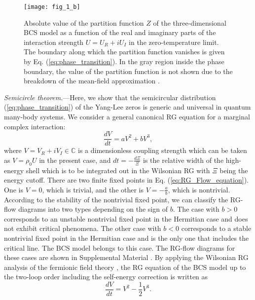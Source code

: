 \documentclass[aps,prl,twocolumn,superscriptaddress]{revtex4-1}
\begin{document}
\begin{bibunit}[apsrev4-2]
\begin{figure}
\texttt{[image: fig\_1\_b]}

\caption{Absolute value of the partition function $Z$ of the three-dimensional
BCS model as a function of the real and imaginary parts of the interaction
strength $U=U_{R}+iU_{I}$ in the zero-temperature limit. The boundary
along which the partition function vanishes is given by Eq. (\ref{eq:phase_transition}). In the gray region inside
the phase boundary, the value of the partition function is not shown
due to the breakdown of the mean-field approximation \cite{Yamamoto2019}.}

\label{Phase_transition_line}
\end{figure}

\emph{Semicircle theorem}.---Here, we show that the semicircular
distribution (\ref{eq:phase_transition}) of the Yang-Lee zeros is generic and universal in quantum many-body systems.
We consider a general canonical RG equation for a marginal
complex interaction: 
\begin{equation}
\frac{dV}{dt}=aV^{2}+bV^{3},\label{eq:RG_Flow_equation}
\end{equation}
where $V=V_{R}+iV_{I}\in\mathbb{C}$ is a dimensionless coupling strength
which can be taken as $V=\rho_{0}U$ in the present case, and $dt=-\frac{d\Xi}{\Xi}$
is the relative width of the high-energy shell which is to be integrated out in the Wilsonian RG with $\Xi$ being the energy cutoff. There are two finite fixed points in Eq. (\ref{eq:RG_Flow_equation}). One is $V=0$, which is trivial, and the other is $V=-\frac{a}{b}$, which is nontrivial. According to the stability of the nontrivial
fixed point, we can classify the RG-flow diagrams into two types depending on the sign of $b$.
The case with $b>0$ corresponds to an unstable nontrivial fixed point
in the Hermitian case and does not exhibit critical phenomena. The
other case with $b<0$ corresponds to a stable nontrivial fixed point
in the Hermitian case and is the only one that includes the critical line. The BCS model belongs to this case.
The RG-flow diagrams for these cases are shown in Supplemental
Material \cite{SupplementaryMaterial}. By applying the Wilsonian RG analysis
of the fermionic field theory \cite{Shankar1994}, the RG equation of
the BCS model up to the two-loop order including the self-energy correction
is written as \cite{SupplementaryMaterial} 
\begin{equation}
\frac{dV}{dt}=V^{2}-\frac{1}{2}V^{3}.\label{eq:rg_equation}
\end{equation}

\end{bibunit}
\end{document}
